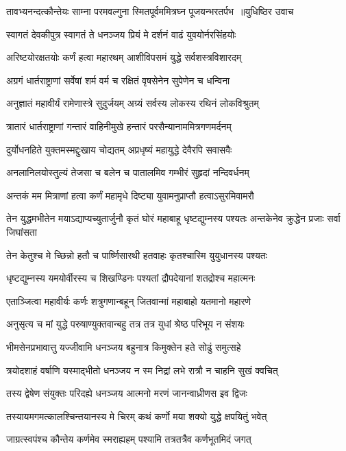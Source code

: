 \threelineshloka
{तावभ्यनन्दत्कौन्तेयः साम्ना परमवल्गुना}
{स्मितपूर्वममित्रघ्न पूजयन्भरतर्पभ ॥युधिष्ठिर उवाच}
{}


\twolineshloka
{स्वागतं देवकीपुत्र स्वागतं ते धनञ्जय}
{प्रियं मे दर्शनं वाढं युवयोर्नरसिंहयोः}


\twolineshloka
{अरिष्टयोरक्षतयोः कर्णं हत्वा महारथम्}
{आशीविपसमं युद्धे सर्वशस्त्रविशारदम्}


\twolineshloka
{अग्रगं धार्तराष्ट्राणां सर्वेषां शर्म वर्म च}
{रक्षितं वृषसेनेन सुपेणेन च धन्विना}


\twolineshloka
{अनुज्ञातं महावीर्यं रामेणास्त्रे सुदुर्जयम्}
{अग्र्यं सर्वस्य लोकस्य रथिनं लोकविश्रुतम्}


\twolineshloka
{त्रातारं धार्तराष्ट्राणां गन्तारं वाहिनीमुखे}
{हन्तारं परसैन्यानाममित्रगणमर्दनम्}


\twolineshloka
{दुर्योधनहिते युक्तमस्मद्दुःखाय चोद्यतम्}
{अप्रधृष्यं महायुद्धे देवैरपि सवासवैः}


\twolineshloka
{अनलानिलयोस्तुल्यं तेजसा च बलेन च}
{पातालमिव गम्भीरं सुहृदां नन्दिवर्धनम्}


\twolineshloka
{अन्तकं मम मित्राणां हत्वा कर्णं महामृधे}
{दिष्ट्या युवामनुप्राप्तौ हत्वाऽसुरमिवामरौ}


\threelineshloka
{तेन युद्धमभीतेन मयाऽद्याप्यच्युतार्जुनौ}
{कृतं घोरं महाबाहू धृष्टद्युम्नस्य पश्यतः}
{अन्तकेनेव क्रुद्धेन प्रजाः सर्वा जिघांसता}


\twolineshloka
{तेन केतुश्च मे च्छिन्नो हतौ च पार्ष्णिसारथी}
{हतवाहः कृतश्चास्मि युयुधानस्य पश्यतः}


\twolineshloka
{धृष्टद्युम्नस्य यमयोर्वीरस्य च शिखण्डिनः}
{पश्यतां द्रौपदेयानां शतद्रोश्च महात्मनः}


\twolineshloka
{एताञ्जित्वा महावीर्यः कर्णः शत्रुगणान्बहून्}
{जितवान्मां महाबाहो यतमानो महारणे}


\twolineshloka
{अनुसृत्य च मां युद्धे परुषाण्युक्तवान्बहु}
{तत्र तत्र युधां श्रेष्ठ परिभूय न संशयः}


\twolineshloka
{भीमसेनप्रभावात्तु यज्जीवामि धनञ्जय}
{बहुनात्र किमुक्तेन हते सोढुं समुत्सहे}


\twolineshloka
{त्रयोदशाहं वर्षाणि यस्माद्भीतो धनञ्जय}
{न स्म निद्रां लभे रात्रौ न चाहनि सुखं क्वचित्}


\twolineshloka
{तस्य द्वेषेण संयुक्तः परिदह्ये धनञ्जय}
{आत्मनो मरणं जानन्वाध्रीणस इव द्विजः}


\twolineshloka
{तस्यायमगमत्कालश्चिन्तयानस्य मे चिरम्}
{कथं कर्णो मया शक्यो युद्धे क्षपयितुं भवेत्}


\twolineshloka
{जाग्रत्स्वपंश्च कौन्तेय कर्णमेव स्मराह्यहम्}
{पश्यामि तत्रतत्रैव कर्णभूतमिदं जगत्}


